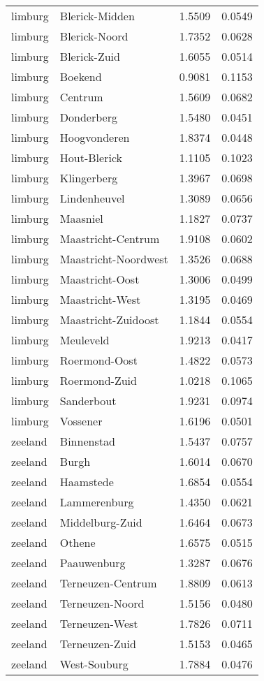 \begin{longtable}{llcc}
limburg & Blerick-Midden & 1.5509 & 0.0549 \\
limburg & Blerick-Noord & 1.7352 & 0.0628 \\
limburg & Blerick-Zuid & 1.6055 & 0.0514 \\
limburg & Boekend & 0.9081 & 0.1153 \\
limburg & Centrum & 1.5609 & 0.0682 \\
limburg & Donderberg & 1.5480 & 0.0451 \\
limburg & Hoogvonderen & 1.8374 & 0.0448 \\
limburg & Hout-Blerick & 1.1105 & 0.1023 \\
limburg & Klingerberg & 1.3967 & 0.0698 \\
limburg & Lindenheuvel & 1.3089 & 0.0656 \\
limburg & Maasniel & 1.1827 & 0.0737 \\
limburg & Maastricht-Centrum & 1.9108 & 0.0602 \\
limburg & Maastricht-Noordwest & 1.3526 & 0.0688 \\
limburg & Maastricht-Oost & 1.3006 & 0.0499 \\
limburg & Maastricht-West & 1.3195 & 0.0469 \\
limburg & Maastricht-Zuidoost & 1.1844 & 0.0554 \\
limburg & Meuleveld & 1.9213 & 0.0417 \\
limburg & Roermond-Oost & 1.4822 & 0.0573 \\
limburg & Roermond-Zuid & 1.0218 & 0.1065 \\
limburg & Sanderbout & 1.9231 & 0.0974 \\
limburg & Vossener & 1.6196 & 0.0501 \\
zeeland & Binnenstad & 1.5437 & 0.0757 \\
zeeland & Burgh & 1.6014 & 0.0670 \\
zeeland & Haamstede & 1.6854 & 0.0554 \\
zeeland & Lammerenburg & 1.4350 & 0.0621 \\
zeeland & Middelburg-Zuid & 1.6464 & 0.0673 \\
zeeland & Othene & 1.6575 & 0.0515 \\
zeeland & Paauwenburg & 1.3287 & 0.0676 \\
zeeland & Terneuzen-Centrum & 1.8809 & 0.0613 \\
zeeland & Terneuzen-Noord & 1.5156 & 0.0480 \\
zeeland & Terneuzen-West & 1.7826 & 0.0711 \\
zeeland & Terneuzen-Zuid & 1.5153 & 0.0465 \\
zeeland & West-Souburg & 1.7884 & 0.0476 \\
\hline
\end{longtable}
